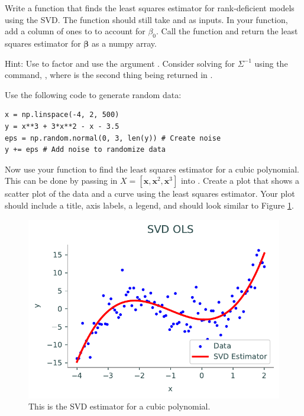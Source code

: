 \begin{problem}
Write a function that finds the least squares estimator for rank-deficient models using the SVD. 
The function should still take  and  as inputs. In your function, add a column of ones to  to account for $\beta_0$. Call the function  and return the least squares estimator for $\boldsymbol\beta$ as a numpy array.

Hint: Use  to factor  and use the argument . Consider solving for $\Sigma^{-1}$ using the command, , where  is the second thing being returned in .  
\end{problem}

\begin{problem}
Use the following code to generate random data:
\begin{lstlisting}
x = np.linspace(-4, 2, 500)
y = x**3 + 3*x**2 - x - 3.5 
eps = np.random.normal(0, 3, len(y)) # Create noise 
y += eps # Add noise to randomize data
\end{lstlisting} 
Now use your function  to find the least squares estimator for a cubic polynomial. 
This can be done by passing in $X=[\boldsymbol x, \boldsymbol x^2, \boldsymbol x^3]$ into .
Create a plot that shows a scatter plot of the data and a curve using the least squares estimator. 
Your plot should include a title, axis labels, a legend, and should look similar to Figure \ref{fig:prob4}.
\end{problem}

\begin{figure}[H]
    \includegraphics[width=.7\textwidth]{figures/cubic_polynomial.pdf}
    \caption{This is the SVD estimator for a cubic polynomial.}
    \label{fig:prob4}
\end{figure}

